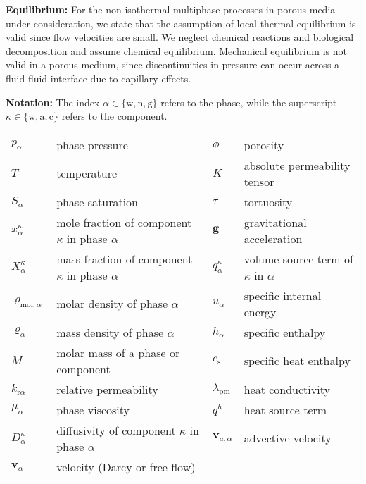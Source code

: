 \textbf{Equilibrium:}
For the non-isothermal multiphase processes in porous media under
consideration, we state that the assumption of local thermal
equilibrium is valid since flow velocities are small. We neglect
chemical reactions and biological decomposition and assume chemical
equilibrium.  Mechanical equilibrium is not valid in a porous medium,
since discontinuities in pressure can occur across a fluid-fluid
interface due to capillary effects.

\textbf{Notation:} The index $\alpha \in \{\text{w}, \text{n}, \text{g}\}$ refers
to the phase, while the superscript $\kappa \in \{\text{w}, \text{a}, \text{c}\}$ refers
to the component. \\
\begin{tabular}{llll}
$p_\alpha$ & phase pressure & $\phi$ & porosity \\
$T$ & temperature & $K$ & absolute permeability tensor \\
$S_\alpha$ & phase saturation & $\tau$ & tortuosity \\
$x_\alpha^\kappa$ & mole fraction of component $\kappa$ in phase $\alpha$ & $\boldsymbol{g}$ & gravitational acceleration \\
$X_\alpha^\kappa$ & mass fraction of component $\kappa$ in phase $\alpha$ & $q^\kappa_\alpha$ & volume source term of $\kappa$ in $\alpha$ \\
$\varrho_{\text{mol},\alpha}$ & molar density of phase $\alpha$ & $u_\alpha$ & specific internal energy \\
$\varrho_{\alpha}$ & mass density of phase $\alpha$ & $h_\alpha$ & specific enthalpy \\
$M$ & molar mass of a phase or component & $c_\text{s}$ & specific heat enthalpy \\
$k_{\text{r}\alpha}$ & relative permeability & $\lambda_\text{pm}$ & heat conductivity \\
$\mu_\alpha$ & phase viscosity & $q^h$ & heat source term \\
$D_\alpha^\kappa$ & diffusivity of component $\kappa$ in phase $\alpha$ & $\boldsymbol{v}_{a,\alpha}$  & advective velocity \\
$\boldsymbol{v}_\alpha$ & velocity (Darcy or free flow)& & \\
\end{tabular}


